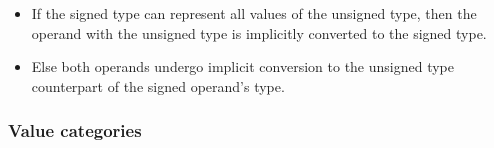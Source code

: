 {\begin{itemize}
\begin{itemize}
\begin{itemize}
            \begin{itemize}
                \item If the signed type can represent all values of the unsigned type, then the operand with the unsigned type is implicitly converted to the signed type.
                \item Else both operands undergo implicit conversion to the unsigned type counterpart of the signed operand's type.
            \end{itemize}
        \end{itemize}
    \end{itemize}
\end{itemize}
}

\subsubsection{Value categories}

